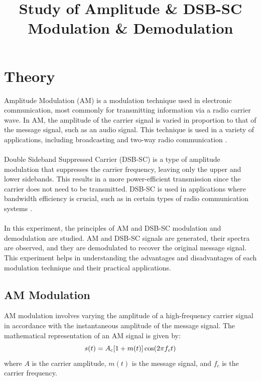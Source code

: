 \documentclass[12pt]{article}
\title{Study of Amplitude \& DSB-SC Modulation \& Demodulation}
\author{}
\date{}
\begin{document}


\pagebreak

\tableofcontents

\pagebreak
{}
\maketitle

\section*{Theory}
Amplitude Modulation (AM) is a modulation technique used in electronic communication, most commonly for transmitting information via a radio carrier wave. In AM, the amplitude of the carrier signal is varied in proportion to that of the message signal, such as an audio signal. This technique is used in a variety of applications, including broadcasting and two-way radio communication \cite{haykin2008communication}.
\\\\
Double Sideband Suppressed Carrier (DSB-SC) is a type of amplitude modulation that suppresses the carrier frequency, leaving only the upper and lower sidebands. This results in a more power-efficient transmission since the carrier does not need to be transmitted. DSB-SC is used in applications where bandwidth efficiency is crucial, such as in certain types of radio communication systems \cite{proakis2007digital}.
\\\\
In this experiment, the principles of AM and DSB-SC modulation and demodulation are studied. AM and DSB-SC signals are generated, their spectra are observed, and they are demodulated to recover the original message signal. This experiment helps in understanding the advantages and disadvantages of each modulation technique and their practical applications.

\subsection*{AM Modulation}
AM modulation involves varying the amplitude of a high-frequency carrier signal in accordance with the instantaneous amplitude of the message signal. The mathematical representation of an AM signal is given by:
\[
    s(t) = A\textsubscript{c}[1 + m(t)] \cos(2 \pi f_c t)
\]
where \(A\) is the carrier amplitude, \(m(t)\) is the message signal, and \(f_c\) is the carrier frequency.
\end{document}
